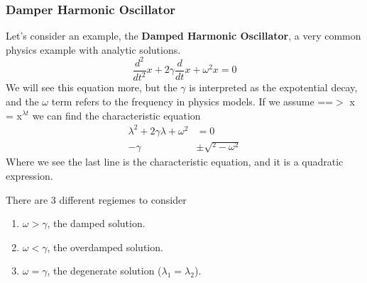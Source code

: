 \documentclass{article}
\newcommand{\be}{\begin{equation}}
\newcommand{\ee}{\end{equation}}
\newcommand{\benum}{\begin{enumerate}}
\newcommand{\eenum}{\end{enumerate}}
\begin{document}
\subsubsection*{Damper Harmonic Oscillator}
Let's consider an example, the \textbf{Damped Harmonic Oscillator}, a very common physics example with analytic solutions. 
\be
\frac{d^2}{dt^2} x + 2\gamma \frac{d}{dt} x + \omega^2 x = 0
\ee
We will see this equation more, but the $\gamma$ is interpreted as the expotential decay, and the $\omega$ term refers to the frequency in physics models. 
If we assume ==$>$ x = x$^{\lambda t}$ we can find the characteristic equation
\be
\begin{split}
\lambda^2 + 2\gamma\lambda  + \omega^2 &= 0\\
-\gamma & \pm \sqrt{^2 - \omega^2}
\end{split}
\ee
Where we see the last line is the characteristic equation, and it is a quadratic expression. 

There are 3 different regiemes to consider
\benum
\item $\omega > \gamma$, the damped solution.
\item $\omega < \gamma$, the overdamped solution.
\item $\omega = \gamma$, the degenerate solution ($\lambda_1 = \lambda_2$).
\eenum

\end{document}
